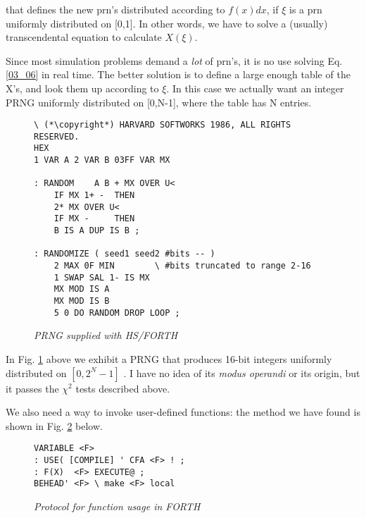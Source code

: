 that defines the new prn's distributed according to $f(x)dx$, if $\xi$ is a prn uniformly distributed on [0,1]. In other words, we have to solve a (usually) transcendental equation to calculate $X(\xi)$.

Since most simulation problems demand a \textit{lot} of prn's, it is no use solving Eq. \ref{03_06} in real time. The better solution is to define a large enough table of the X's, and look them up according to $\xi$. In this case we actually want an integer PRNG uniformly distributed on [0,N-1], where the table has N entries.

\begin{figure}[H]
    \label{fig:03_03}
    \begin{mdframed}
        \begin{lstlisting}
\ (*\copyright*) HARVARD SOFTWORKS 1986, ALL RIGHTS RESERVED.
HEX
1 VAR A 2 VAR B 03FF VAR MX

: RANDOM    A B + MX OVER U<
    IF MX 1+ -  THEN
    2* MX OVER U<
    IF MX -     THEN
    B IS A DUP IS B ;

: RANDOMIZE ( seed1 seed2 #bits -- )
    2 MAX 0F MIN        \ #bits truncated to range 2-16
    1 SWAP SAL 1- IS MX
    MX MOD IS A
    MX MOD IS B
    5 0 DO RANDOM DROP LOOP ;
        \end{lstlisting}
    \end{mdframed}
    \caption{\textit{PRNG supplied with HS/FORTH}}
\end{figure}

In Fig. \ref{fig:03_03} above we exhibit a PRNG that produces 16-bit integers uniformly distributed on $[0, 2^N-1]$ . I have no idea of its \textit{modus operandi} or its origin, but it passes the $\chi^2$ tests described above.

We also need a way to invoke user-defined functions: the method we have found is shown in Fig. \ref{fig:03_04} below.

\begin{figure}[H]
    \label{fig:03_04}
    \begin{mdframed}
        \begin{lstlisting}
VARIABLE <F>
: USE( [COMPILE] ' CFA <F> ! ;
: F(X)  <F> EXECUTE@ ;
BEHEAD' <F> \ make <F> local
        \end{lstlisting}
    \end{mdframed}
    \caption{\textit{Protocol for function usage in FORTH}}
\end{figure}

